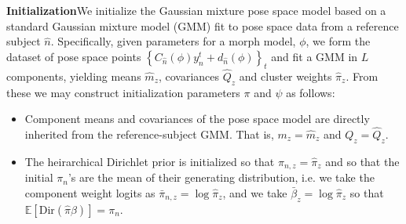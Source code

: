 \documentclass{article}         %
\newcommand{\EE}{\mathbb{E}}
\newcommand{\cb}[1]{\left\{ #1 \right\}}
\begin{document}
\textbf{Initialization}\quad We initialize the Gaussian mixture pose space model based on a standard Gaussian mixture model (GMM) fit to pose space data from a reference subject $\hat{n}$. Specifically, given parameters for a morph model, $\phi$, we form the dataset of pose space points $\cb{C_{\hat{n}}(\phi) y^t_n + d_{\hat{n}}(\phi)}_t$ and fit a GMM in $L$ components, yielding means $\hat{m}_z$, covariances $\hat{Q}_z$ and cluster weights $\hat\pi_z$. From these we may construct initialization parameters $\pi$ and $\psi$ as follows:
\begin{itemize}
    \item Component means and covariances of the pose space model are directly inherited from the reference-subject GMM. That is, $m_z = \hat{m}_z$ and $Q_z = \hat{Q}_z$.
    \item The heirarchical Dirichlet prior is initialized so that $\pi_{n, z} = \hat{\pi}_z$ and so that the initial $\pi_n$'s are the mean of their generating distribution, i.e. we take the component weight logits as $\bar\pi_{n, z} = \log \hat\pi_z$, and we take $\bar\beta_z = \log \hat\pi_z$ so that $\EE[\text{Dir}(\hat\pi \beta)] = \pi_n$.
\end{itemize}
\end{document}
